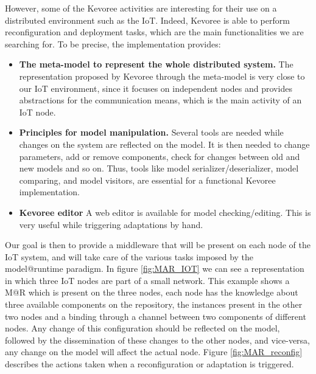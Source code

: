 However, some of the Kevoree activities are interesting for their use on a distributed environment such as the IoT.
Indeed, Kevoree is able to perform reconfiguration and deployment tasks, which are the main functionalities we are searching for.
To be precise, the implementation provides:

\begin{itemize}
	\item \textbf{The meta-model to represent the whole distributed system.} The representation proposed by Kevoree through the meta-model is very close to our IoT environment, since it focuses on independent nodes and provides abstractions for the communication means, which is the main activity of an IoT node.
	\item \textbf{Principles for model manipulation.} Several tools are needed while changes on the system are reflected on the model. It is then needed to change parameters, add or remove components, check for changes between old and new models and so on. Thus, tools like model serializer/deserializer, model comparing, and model visitors, are essential for a functional Kevoree implementation.
	\item \textbf{Kevoree editor} A web editor is available for model checking/editing. This is very useful while triggering adaptations by hand.
\end{itemize}

Our goal is then to provide a middleware that will be present on each node of the IoT system, and will take care of the various tasks imposed by the model@runtime paradigm.
In figure \ref{fig:MAR_IOT} we can see a representation in which three IoT nodes are part of a small network.
This example shows a M@R which is present on the three nodes, each node has the knowledge about three available components on the repository, the instances present in the other two nodes and a binding through a channel between two components of different nodes.
Any change of this configuration should be reflected on the model, followed by the dissemination of these changes to the other nodes, and vice-versa, any change on the model will affect the actual node.
Figure \ref{fig:MAR_reconfig} describes the actions taken when a reconfiguration or adaptation is triggered.

